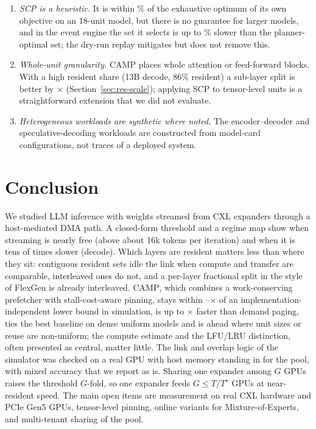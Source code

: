 \documentclass[preprint,12pt]{elsarticle}
\newcommand{\camp}{\textsc{CAMP}}
\begin{document}
\begin{enumerate}
\item \emph{SCP is a heuristic.} It is within \nGapScpMax\% of the exhaustive optimum of its own objective on an 18-unit model, but there is no guarantee for larger models, and in the event engine the set it selects is up to \nGapSimMax\% slower than the planner-optimal set; the dry-run replay mitigates but does not remove this.
\item \emph{Whole-unit granularity.} \camp{} places whole attention or feed-forward blocks. With a high resident share (13B decode, 86\% resident) a sub-layer split is better by \nThirteenDecCampOverFg$\times$ (Section~\ref{sec:res-scale}); applying SCP to tensor-level units is a straightforward extension that we did not evaluate.
\item \emph{Heterogeneous workloads are synthetic where noted.} The encoder--decoder and speculative-decoding workloads are constructed from model-card configurations, not traces of a deployed system.
\end{enumerate}

\section{Conclusion}
\label{sec:conclusion}

We studied LLM inference with weights streamed from CXL expanders through a host-mediated DMA path. A closed-form threshold and a regime map show when streaming is nearly free (above about 16k tokens per iteration) and when it is tens of times slower (decode). Which layers are resident matters less than where they sit: contiguous resident sets idle the link when compute and transfer are comparable, interleaved ones do not, and a per-layer fractional split in the style of FlexGen is already interleaved. \camp{}, which combines a work-conserving prefetcher with stall-cost-aware pinning, stays within \nDetLbMed--\nDetLbMax$\times$ of an implementation-independent lower bound in simulation, is up to \nDemOverCampMax$\times$ faster than demand paging, ties the best baseline on dense uniform models and is ahead where unit sizes or reuse are non-uniform; the compute estimate and the LFU/LRU distinction, often presented as central, matter little. The link and overlap logic of the simulator was checked on a real GPU with host memory standing in for the pool, with mixed accuracy that we report as is. Sharing one expander among $G$ GPUs raises the threshold $G$-fold, so one expander feeds $G\le T/T^\star$ GPUs at near-resident speed. The main open items are measurement on real CXL hardware and PCIe Gen5 GPUs, tensor-level pinning, online variants for Mixture-of-Experts, and multi-tenant sharing of the pool.
\end{document}
